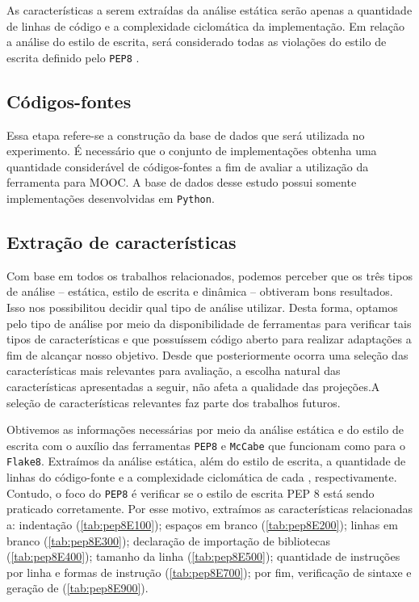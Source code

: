 			As características a serem extraídas da análise estática serão apenas a quantidade
			de linhas de código e a complexidade ciclomática da implementação. Em relação
			a análise do estilo de escrita, será considerado todas as violações do estilo de
			escrita definido pelo \texttt{PEP8} \cite{van2001pep}. 

		\subsection{Códigos-fontes}	
			Essa etapa refere-se a construção da base de dados que será utilizada no experimento.
			É necessário que o conjunto de implementações obtenha uma quantidade considerável de
			códigos-fontes a fim de avaliar a utilização da ferramenta para \acs{MOOC}. A
			base de dados desse estudo possui somente implementações desenvolvidas em \texttt{Python}.
			
		\subsection{Extração de características} %
		
			Com base em todos os trabalhos relacionados, podemos perceber que os três
			tipos de análise -- estática, estilo de escrita e dinâmica -- obtiveram
			bons resultados. Isso nos possibilitou decidir qual tipo de análise
			utilizar. Desta forma, optamos pelo tipo de análise por meio da disponibilidade
			de ferramentas para verificar tais tipos de características e que possuíssem
			código aberto para realizar adaptações a fim de alcançar nosso objetivo.
			Desde que posteriormente ocorra uma seleção das características mais relevantes
			para avaliação, a escolha natural das características apresentadas a seguir,
			não afeta a qualidade das projeções.A seleção de características relevantes
			faz parte dos trabalhos futuros.
			
			Obtivemos as informações necessárias por meio da análise estática e do estilo de   
			escrita com o auxílio das ferramentas \texttt{PEP8} \cite{pep8} e \texttt{McCabe}
			\cite{mccabe} que funcionam como  para o \texttt{Flake8}.
			Extraímos da análise estática, além do estilo de escrita, a quantidade de linhas do código-fonte e a complexidade ciclomática de cada , respectivamente. Contudo, o
			foco do \texttt{PEP8} é verificar se o estilo de escrita PEP 8 \cite{van2001pep}
			está sendo praticado corretamente. Por esse motivo, extraímos as características
			relacionadas a: indentação (\cref{tab:pep8E100}); espaços em branco
			(\cref{tab:pep8E200}); linhas em branco (\cref{tab:pep8E300}); declaração de
			importação de bibliotecas (\cref{tab:pep8E400}); tamanho da linha (\cref{tab:pep8E500});
			quantidade de instruções por linha e formas de instrução (\cref{tab:pep8E700}); por fim,
			verificação de sintaxe e geração de  (\cref{tab:pep8E900}).
		
